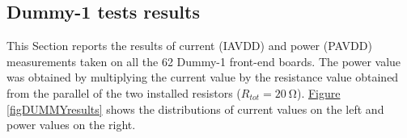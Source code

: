 \begin{table}[h!]
    \centering
    \def\arraystretch{1.3}
    \caption{Structure of the entry for the Dummy-1 front-end boards test report.}
    \label{tabDUMMYstruct}
\end{table}


\subsection{Dummy-1 tests results}
This Section reports the results of current (IAVDD) and power (PAVDD) measurements taken on all the 62 Dummy-1 front-end boards. The power value was obtained by multiplying the current value by the resistance value obtained from the parallel of the two installed resistors ($R_{tot} = \SI{20}{\ohm}$). \hyperref[figDUMMYresults]{Figure \ref{figDUMMYresults}} shows the distributions of current values on the left and power values on the right.

